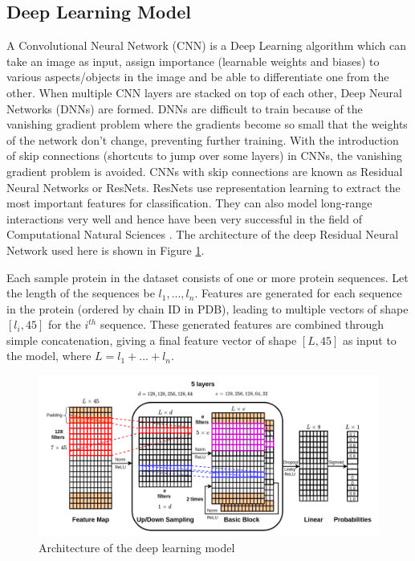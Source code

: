 \documentclass[journal=jacsat,manuscript=article]{achemso}
\begin{document}
\subsection{Deep Learning Model}
\quad A Convolutional Neural Network (CNN) is a Deep Learning algorithm which can take an image as input, assign importance (learnable weights and biases) to various aspects/objects in the image and be able to differentiate one from the other. When multiple CNN layers are stacked on top of each other, Deep Neural Networks (DNNs) are formed. DNNs are difficult to train because of the vanishing gradient problem where the gradients become so small that the weights of the network don't change, preventing further training. With the introduction of skip connections (shortcuts to jump over some layers) in CNNs, the vanishing gradient problem is avoided. CNNs with skip connections are known as Residual Neural Networks or ResNets. ResNets use representation learning to extract the most important features for classification. They can also model long-range interactions very well and hence have been very successful in the field of Computational Natural Sciences \cite{senior2020improved}.  The architecture of the deep Residual Neural Network used here is shown in Figure \ref{fig:architecture}.

Each sample protein in the dataset consists of one or more protein sequences. Let the length of the sequences be $l_1, ..., l_n$. Features are generated for each sequence in the protein (ordered by chain ID in PDB), leading to multiple vectors of shape $[l_i, 45]$ for the $i^{th}$ sequence. These generated features are combined through simple concatenation, giving a final feature vector of shape $[L, 45]$ as input to the model, where $L = l_1 + ... + l_n$.

\begin{figure}
    \centering
    \noindent\includegraphics[scale=0.5]{architecture}
    \caption{\centering Architecture of the deep learning model}
    \label{fig:architecture}
\end{figure}
\end{document}
